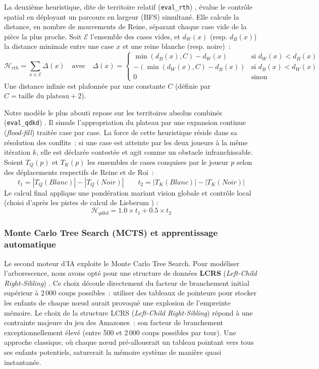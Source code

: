 \documentclass[a4paper]{article}
\begin{document}
La deuxième heuristique, dite de territoire relatif (\texttt{eval\_rth}) \cite{Hensgens2001},
évalue le contrôle spatial en déployant un parcours en largeur (BFS)
simultané. Elle calcule la distance, en nombre de mouvements de Reine,
séparant chaque case vide de la pièce la plus proche. Soit $\mathcal{E}$
l'ensemble des cases vides, et $d_W(x)$ (resp. $d_B(x)$) la distance minimale
entre une case $x$ et une reine blanche (resp. noire)~:
$$ \mathcal{H}_{rth} = \sum_{x \in \mathcal{E}} \Delta(x) \quad \text{avec} \quad \Delta(x) =
\begin{cases}
\min(d_B(x), C) - d_W(x) & \text{si } d_W(x) < d_B(x) \\
-(\min(d_W(x), C) - d_B(x)) & \text{si } d_B(x) < d_W(x) \\
0 & \text{sinon}
\end{cases} $$
Une distance infinie est plafonnée par une constante $C$ (définie par
$C = \text{taille du plateau} + 2$).

Notre modèle le plus abouti repose sur les territoires absolus combinés
(\texttt{eval\_qdkd}) \cite{Lieberum2005}. Il simule l'appropriation du plateau par une
expansion continue (\textit{flood-fill}) traitée case par case. La force
de cette heuristique réside dans sa résolution des conflits~: si une case
est atteinte par les deux joueurs à la même itération $k$, elle est déclarée
contestée et agit comme un obstacle infranchissable. Soient $T_Q(p)$ et
$T_K(p)$ les ensembles de cases conquises par le joueur $p$ selon des
déplacements respectifs de Reine et de Roi~:
$$ t_1 = |T_Q(Blanc)| - |T_Q(Noir)| \qquad t_2 = |T_K(Blanc)| - |T_K(Noir)| $$
Le calcul final applique une pondération mariant vision globale et contrôle
local~ (choisi d'après les pistes de calcul de Lieberum \cite{Lieberum2005}) :
$$ \mathcal{H}_{qdkd} = 1.0 \times t_1 + 0.5 \times t_2 $$

\subsubsection{Monte Carlo Tree Search (MCTS) et apprentissage automatique}

Le second moteur d'IA exploite le Monte Carlo Tree Search. Pour modéliser
l'arborescence, nous avons opté pour une structure de données
\textbf{LCRS} (\textit{Left-Child Right-Sibling}) \cite{GeeksforGeeks2025_LCRS}. Ce choix découle
directement du facteur de branchement initial supérieur à 2\,000 coups
possibles~: utiliser des tableaux de pointeurs pour stocker les enfants
de chaque nœud aurait provoqué une explosion de l'empreinte mémoire.
Le choix de la structure LCRS (\textit{Left-Child Right-Sibling}) répond à une contrainte majeure du jeu des Amazones~: son facteur de branchement exceptionnellement élevé (entre 500 et 2\,000 coups possibles par tour). Une approche classique, où chaque nœud pré-allouerait un tableau pointant vers tous ses enfants potentiels, saturerait la mémoire système de manière quasi instantanée. 
\end{document}
